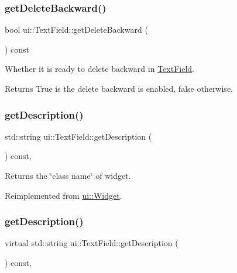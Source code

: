 \subsubsection{\texorpdfstring{get\+Delete\+Backward()}{getDeleteBackward()}\hspace{0.1cm}{\footnotesize\ttfamily [2/2]}}
{\footnotesize\ttfamily bool ui\+::\+Text\+Field\+::get\+Delete\+Backward (\begin{DoxyParamCaption}{ }\end{DoxyParamCaption}) const}



Whether it is ready to delete backward in \hyperlink{classui_1_1TextField}{Text\+Field}. 

\begin{DoxyReturn}{Returns}
True is the delete backward is enabled, false otherwise. 
\end{DoxyReturn}
\mbox{\label{classui_1_1TextField_a4bad40260133981d610490c948bc0648}} 
\subsubsection{\texorpdfstring{get\+Description()}{getDescription()}\hspace{0.1cm}{\footnotesize\ttfamily [1/2]}}
{\footnotesize\ttfamily std\+::string ui\+::\+Text\+Field\+::get\+Description (\begin{DoxyParamCaption}{ }\end{DoxyParamCaption}) const\hspace{0.3cm}{\ttfamily [override]}, {\ttfamily [virtual]}}

Returns the \char`\"{}class name\char`\"{} of widget. 

Reimplemented from \hyperlink{classui_1_1Widget_ad85abdaa9133dc6b8efc32670ae9b93f}{ui\+::\+Widget}.

\mbox{\label{classui_1_1TextField_ad3dd2bd1a5d8d501e63d5922c95c1bc2}} 
\subsubsection{\texorpdfstring{get\+Description()}{getDescription()}\hspace{0.1cm}{\footnotesize\ttfamily [2/2]}}
{\footnotesize\ttfamily virtual std\+::string ui\+::\+Text\+Field\+::get\+Description (\begin{DoxyParamCaption}{ }\end{DoxyParamCaption}) const\hspace{0.3cm}{\ttfamily [override]}, {\ttfamily [virtual]}}

